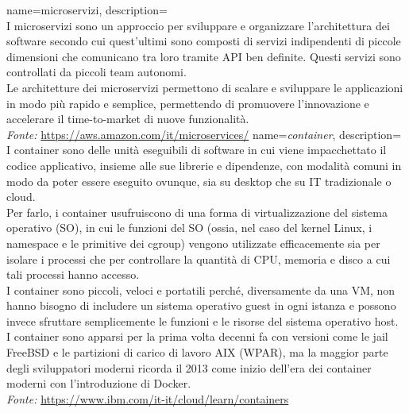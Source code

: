 {
    name=microservizi,
    description={\hfill \\
    I microservizi sono un approccio per sviluppare e organizzare l’architettura dei software secondo cui quest’ultimi sono composti di servizi indipendenti di piccole dimensioni che comunicano tra loro tramite API ben definite. Questi servizi sono controllati da piccoli team autonomi.\\
    Le architetture dei microservizi permettono di scalare e sviluppare le applicazioni in modo più rapido e semplice, permettendo di promuovere l’innovazione e accelerare il time-to-market di nuove funzionalità.
    \hfill \\
    {\footnotesize\textit{Fonte:} \url{https://aws.amazon.com/it/microservices/}}
    }
}
{
    name=\textit{container},
    description={\hfill \\
    I container sono delle unità eseguibili di software in cui viene impacchettato il codice applicativo, insieme alle sue librerie e dipendenze, con modalità comuni in modo da poter essere eseguito ovunque, sia su desktop che su IT tradizionale o cloud.\\
    Per farlo, i container usufruiscono di una forma di virtualizzazione del sistema operativo (SO), in cui le funzioni del SO (ossia, nel caso del kernel Linux, i namespace e le primitive dei cgroup) vengono utilizzate efficacemente sia per isolare i processi che per controllare la quantità di CPU, memoria e disco a cui tali processi hanno accesso.\\
    I container sono piccoli, veloci e portatili perché, diversamente da una VM, non hanno bisogno di includere un sistema operativo guest in ogni istanza e possono invece sfruttare semplicemente le funzioni e le risorse del sistema operativo host.\\
    I container sono apparsi per la prima volta decenni fa con versioni come le jail FreeBSD e le partizioni di carico di lavoro AIX (WPAR), ma la maggior parte degli sviluppatori moderni ricorda il 2013 come inizio dell'era dei container moderni con l'introduzione di Docker.
    \hfill \\
    {\footnotesize\textit{Fonte:} \url{https://www.ibm.com/it-it/cloud/learn/containers}}
    }
}
